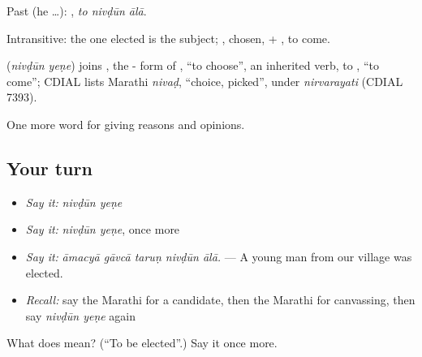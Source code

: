 Past (he …):   , \emph{to nivḍūn ālā}.

Intransitive: the one elected is the subject; , chosen, + , to come.

\begin{cousinweb}
\textbf{ } (\emph{nivḍūn yeṇe}) joins , the - form of , \textquotedblleft{}to choose\textquotedblright{}, an inherited verb, to , \textquotedblleft{}to come\textquotedblright{}; CDIAL lists Marathi \emph{nivaḍ}, \textquotedblleft{}choice, picked\textquotedblright{}, under \emph{nirvarayati} (CDIAL 7393).
\end{cousinweb}

\begin{grammarlens}[title={What you've built}]
One more word for giving reasons and opinions.
\end{grammarlens}

\subsection*{Your turn}
\begin{itemize}
\raggedright
  \item \emph{Say it:} \emph{nivḍūn yeṇe}
  \item \emph{Say it:} \emph{nivḍūn yeṇe}, once more
  \item \emph{Say it:} \emph{āmacyā gāvcā taruṇ nivḍūn ālā.} — A young man from our village was elected.
  \item \emph{Recall:} say the Marathi for a candidate, then the Marathi for canvassing, then say \emph{nivḍūn yeṇe} again
\end{itemize}

\begin{tcolorbox}[breakable,colback=teal!4,colframe=teal!35!black,title={Before you move on}]
What does   mean? (\textquotedblleft{}To be elected\textquotedblright{}.) Say it once more.
\end{tcolorbox}

